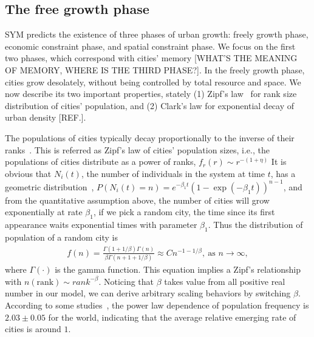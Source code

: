 \documentclass[reprint,unsortedaddress,amsmath,amssymb,aps,prl,showkeys]{revtex4-2}
\begin{document}
\subsection{The free growth phase}

SYM predicts the existence of three phases of urban growth: freely growth phase, economic constraint phase, and spatial constraint phase. We focus on the first two phases, which correspond with cities' memory [WHAT'S THE MEANING OF MEMORY, WHERE IS THE THIRD PHASE?]. In the freely growth phase, cities grow desolately, without being controlled by total resource and space. We now describe its two important properties, stately (1) Zipf's law~\cite{gabaix1999zipf's} for rank size distribution of cities' population, and (2) Clark's law for exponential decay of urban density [REF.]. 

The populations of cities typically decay proportionally to the inverse of their ranks~\cite{gabaix1999zipf's}. This is referred as Zipf's law of cities' population sizes, i.e., the populations of cities distribute as a power of ranks, $f_r(r)\sim r^{-(1+\eta)}$ %
It is obvious that $N_i(t)$, the number of individuals in the system at time $t$, has a geometric distribution~\cite{durrett1999essentials}, $P(N_i(t)=n)=e^{-\beta_1t}(1-\exp(- {\beta_1} t))^{n-1}$, %
and from the quantitative assumption above, the number of cities will grow exponentially at rate $\beta_1$, %
if we pick a random city, the time since its first appearance waits exponential times with parameter $\beta_1$. Thus the distribution of population of a random city is 
\begin{align}
	f(n)=\frac{\Gamma(1+1/\beta)\Gamma(n)}{\beta\Gamma(n+1+1/\beta)}\approx Cn^{-1-1/\beta}, \ \text{as } n\to\infty,
\end{align}
where $\Gamma(\cdot)$ is the gamma function. This equation implies a Zipf's relationship with $n(\text{rank})\sim {rank}^{-\beta}$. Noticing that $\beta$ takes value from all positive real number in our model, we can derive arbitrary scaling behaviors by switching $\beta$. According to some studies~\cite{PhysRevLett.79.523}, the power law dependence of population frequency is $2.03\pm 0.05$ for the world, indicating that the average relative emerging rate of cities is around $1$. 
\end{document}
